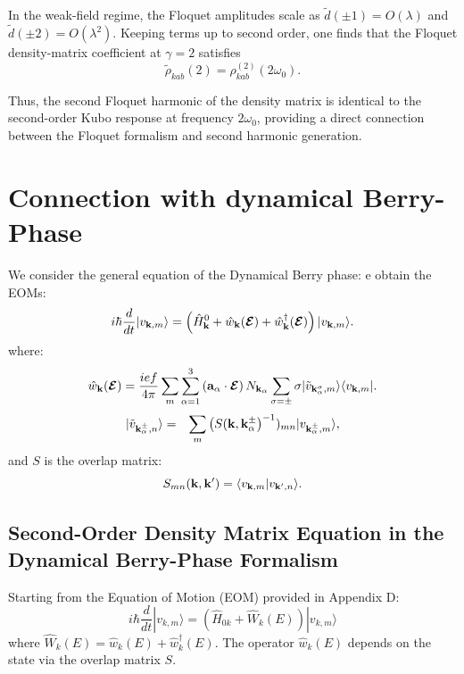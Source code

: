 \documentclass[aps,physrev,preprint,groupedaddress]{revtex4-2}
\newcommand{\be}{\begin{equation}}
\newcommand{\ee}{\end{equation}}
\newcommand{\bea}{\begin{eqnarray}}
\newcommand{\eea}{\end{eqnarray}}
\newcommand{\lv}{{\bf a}}
\newcommand{\kk}{{\bf k}}
\renewcommand{\[}{\left[}
\renewcommand{\]}{\right]}
\renewcommand{\(}{\left(}
\renewcommand{\)}{\right)}
\def\efield{\boldsymbol{\cal E}}
\begin{document}
In the weak-field regime, the Floquet amplitudes scale as
$\tilde d(\pm1)=O(\lambda)$ and $\tilde d(\pm2)=O(\lambda^2)$.
Keeping terms up to second order, one finds that the Floquet
density-matrix coefficient at $\gamma=2$ satisfies
\begin{equation}
\tilde\rho_{kab}(2)
=
\rho^{(2)}_{kab}(2\omega_0).
\end{equation}

Thus, the second Floquet harmonic of the density matrix is
identical to the second-order Kubo response at frequency
$2\omega_0$, providing a direct connection between the Floquet
formalism and second harmonic generation.

\section{Connection with dynamical Berry-Phase}
We consider the general equation of the Dynamical Berry phase:
e obtain the EOMs:
\be
i\hbar  \frac{d}{dt}| v_{\kk,m} \rangle = \left(\hat H_\kk^0 + \hat w_\kk(\efield) +\hat w^\dagger_\kk(\efield) \right)| v_{\kk,m} \rangle. \label{eom_berry}
\ee
where:
\begin{align}
\hat w_\kk(\efield) =\frac{ief}{4 \pi}\sum_m \sum_{\alpha=1}^3 \left(\lv_\alpha\cdot\efield\right)N_{\kk_\alpha} \sum_{\sigma=\pm} \sigma |\tilde v_{\kk^\sigma_\alpha,m} \rangle\langle v_{\kk,m}|.
\label{eq:fldcpl}
\end{align}
\bea
| \tilde v_{ \kk^{\pm}_\alpha,n} \rangle &=& \sum_{m} \left(S(\kk,\kk^{\pm}_\alpha\right)^{-1})_{mn} |v_{\kk^{\pm}_\alpha,m}\rangle, \label{eq:vtilde}
\eea
and $S$ is the overlap matrix:
\be
S_{mn}(\kk , \kk') = \langle v_{\kk,m} | v_{\kk',n} \rangle.
\label{eq:sovlps}
\ee

\subsection{Second-Order Density Matrix Equation in the Dynamical Berry-Phase Formalism}

Starting from the Equation of Motion (EOM) provided in Appendix D:
\begin{equation}
i\hbar\frac{d}{dt}|v_{k,m}\rangle = \left(\hat{H}_{0k} + \hat{W}_k(E)\right) |v_{k,m}\rangle
\end{equation}
where $\hat{W}_k(E) = \hat{w}_k(E) + \hat{w}^\dagger_k(E)$. The operator $\hat{w}_k(E)$ depends on the state via the overlap matrix $S$.
\end{document}
